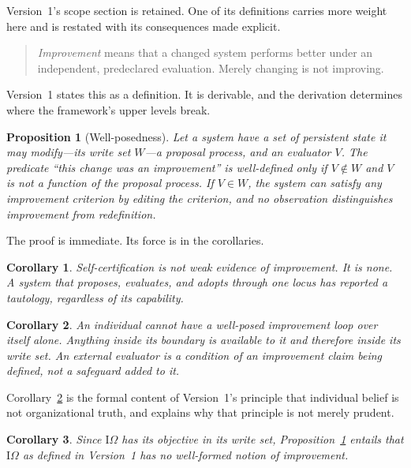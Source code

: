 \documentclass[11pt]{article}
\newtheorem{proposition}{Proposition}
\newtheorem{corollary}{Corollary}
\newcommand{\IOm}{\ensuremath{\mathrm{I}\Omega}}
\begin{document}
Version~1's scope section is retained. One of its definitions carries more weight here and is restated with its consequences made explicit.

\begin{quote}
\emph{Improvement} means that a changed system performs better under an independent, predeclared evaluation. Merely changing is not improving.
\end{quote}

Version~1 states this as a definition. It is derivable, and the derivation determines where the framework's upper levels break.

\begin{proposition}[Well-posedness]\label{prop:wellposed}
Let a system have a set of persistent state it may modify---its write set $W$---a proposal process, and an evaluator $V$. The predicate ``this change was an improvement'' is well-defined only if $V \notin W$ and $V$ is not a function of the proposal process. If $V \in W$, the system can satisfy any improvement criterion by editing the criterion, and no observation distinguishes improvement from redefinition.
\end{proposition}

The proof is immediate. Its force is in the corollaries.

\begin{corollary}\label{cor:selfcert}
Self-certification is not weak evidence of improvement. It is none. A system that proposes, evaluates, and adopts through one locus has reported a tautology, \emph{regardless of its capability}.
\end{corollary}

\begin{corollary}\label{cor:external}
An individual cannot have a well-posed improvement loop over itself alone. Anything inside its boundary is available to it and therefore inside its write set. An external evaluator is a condition of an improvement claim being defined, not a safeguard added to it.
\end{corollary}

Corollary~\ref{cor:external} is the formal content of Version~1's principle that individual belief is not organizational truth, and explains why that principle is not merely prudent.

\begin{corollary}\label{cor:iomega}
Since \IOm{} has its objective in its write set, Proposition~\ref{prop:wellposed} entails that \IOm{} as defined in Version~1 has no well-formed notion of improvement.
\end{corollary}
\end{document}
